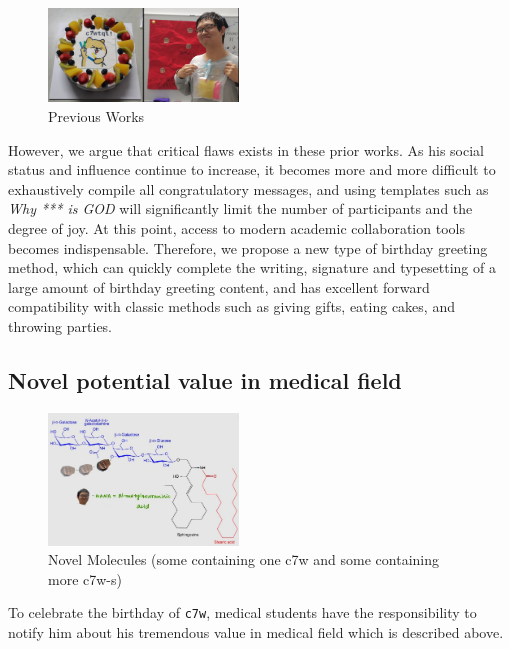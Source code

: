 \documentclass[10pt,twocolumn,letterpaper]{article}
\begin{document}
\begin{figure}[h]
    \centering
    \includegraphics[width=0.45\textwidth]{previous.jpg}
    \caption{Previous Works}
    \label{fig:previous}
\end{figure}

However, we argue that critical flaws exists in these prior works. As his social status and influence continue to increase, it becomes more and more difficult to exhaustively compile all congratulatory messages, and using templates such as \emph{Why *** is GOD} will significantly limit the number of participants and the degree of joy. At this point, access to modern academic collaboration tools becomes indispensable. Therefore, we propose a new type of birthday greeting method, which can quickly complete the writing, signature and typesetting of a large amount of birthday greeting content, and has excellent forward compatibility with classic methods such as giving gifts, eating cakes, and throwing parties.

\subsection{Novel potential value in medical field}

\begin{figure}[h]
    \centering
    \includegraphics[width=0.45\textwidth]{ganglioc7w.jpg}
   \caption{Novel Molecules (some containing one c7w and some containing more c7w-s)}
    \label{fig:ganglioc7w}
\end{figure}

To celebrate the birthday of \verb|c7w|, medical students have the responsibility to notify him about his tremendous value in medical field which is described above. 
\end{document}
